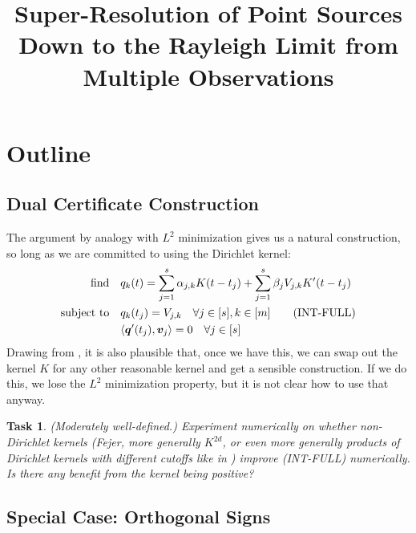 \documentclass[11pt]{article}
\title{Super-Resolution of Point Sources Down to the Rayleigh Limit from Multiple Observations}
\author{}
\newcommand{\ra}{\rangle}
\newcommand{\la}{\langle}
\newcommand{\HS}{\hspace{3.5mm}}
\newcommand{\bv}{\bm v}
\newcommand{\bq}{\bm q}
\newtheorem{task}{Task}
\begin{document}
\maketitle

\noindent

\section{Outline}

\subsection{Dual Certificate Construction}

The argument by analogy with $L^2$ minimization gives us a natural construction, so long as we are committed to using the Dirichlet kernel:
\begin{align*}
  \text{find} &\HS q_k(t) = \sum_{j = 1}^s \alpha_{j, k} K(t - t_j) + \sum_{j = 1}^s \beta_jV_{j, k} K^\prime(t - t_j) \\
  \text{subject to} &\HS q_k(t_j) = V_{j, k} \HS \forall j \in [s], k \in [m] \tag{\text{INT-FULL}} \\
                  &\HS \la \bq^\prime(t_j), \bv_j \ra = 0 \HS \forall j \in [s]
\end{align*}
Drawing from \cite{fernandez2016super}, it is also plausible that, once we have this, we can swap out the kernel $K$ for any other reasonable kernel and get a sensible construction.
If we do this, we lose the $L^2$ minimization property, but it is not clear how to use that anyway.

\begin{task}
    (Moderately well-defined.)
    Experiment numerically on whether non-Dirichlet kernels (Fejer, more generally $K^{2d}$, or even more generally products of Dirichlet kernels with different cutoffs like in \cite{fernandez2016super}) improve (INT-FULL) numerically.
    Is there any benefit from the kernel being positive?
\end{task}

\subsection{Special Case: Orthogonal Signs}
\end{document}
